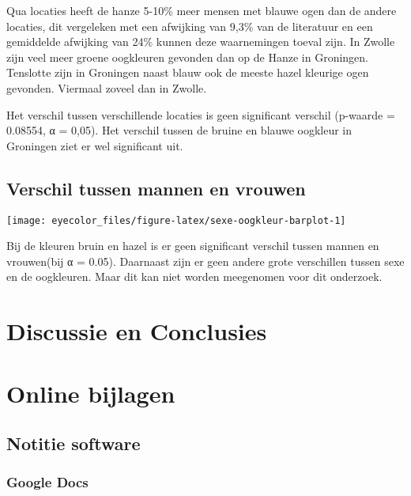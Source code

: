 \documentclass[
]{article}
\let\origfigure\figure
\let\endorigfigure\endfigure
\renewenvironment{figure}[1][2] {
    \expandafter\origfigure\expandafter[H]
} {
    \endorigfigure
}
\begin{document}
Qua locaties heeft de hanze 5-10\% meer mensen met blauwe ogen dan de
andere locaties, dit vergeleken met een afwijking van 9,3\% van de
literatuur en een gemiddelde afwijking van 24\% kunnen deze waarnemingen
toeval zijn. In Zwolle zijn veel meer groene oogkleuren gevonden dan op
de Hanze in Groningen. Tenslotte zijn in Groningen naast blauw ook de
meeste hazel kleurige ogen gevonden. Viermaal zoveel dan in Zwolle.

Het verschil tussen verschillende locaties is geen significant verschil
(p-waarde = 0.08554, α = 0,05). Het verschil tussen de bruine en blauwe
oogkleur in Groningen ziet er wel significant uit.

\hypertarget{verschil-tussen-mannen-en-vrouwen}{%
\subsection{Verschil tussen mannen en vrouwen}\label{verschil-tussen-mannen-en-vrouwen}}

\begin{figure}
\texttt{[image: eyecolor\_files/figure-latex/sexe-oogkleur-barplot-1]} \caption{Barplot aantal oogkleuren per geslacht alle locaties samen. Verdeeld onder sexe.}\label{fig:sexe-oogkleur-barplot}
\end{figure}

Bij de kleuren bruin en hazel is er geen significant verschil tussen
mannen en vrouwen(bij α = 0.05). Daarnaast zijn er geen andere grote
verschillen tussen sexe en de oogkleuren. Maar dit kan niet worden
meegenomen voor dit onderzoek.

\hypertarget{discussie-en-conclusies}{%
\section{Discussie en Conclusies}\label{discussie-en-conclusies}}

\hypertarget{online-bijlagen}{%
\section{Online bijlagen}\label{online-bijlagen}}

\hypertarget{notitie-software}{%
\subsection{Notitie software}\label{notitie-software}}

\hypertarget{g-docs}{%
\subsubsection{Google Docs}\label{g-docs}}
\end{document}

